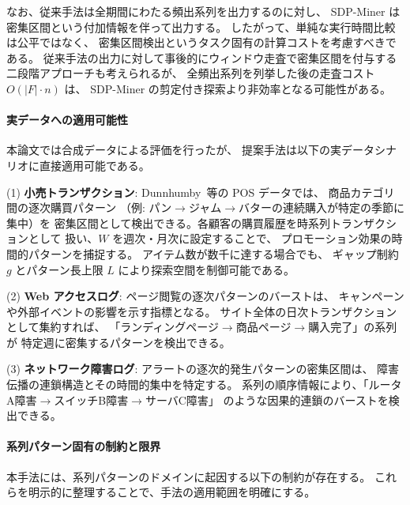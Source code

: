 \documentclass[11pt,a4paper]{article}
\begin{document}
なお、従来手法は全期間にわたる頻出系列を出力するのに対し、
SDP-Miner は密集区間という付加情報を伴って出力する。
したがって、単純な実行時間比較は公平ではなく、
密集区間検出というタスク固有の計算コストを考慮すべきである。
従来手法の出力に対して事後的にウィンドウ走査で密集区間を付与する
二段階アプローチも考えられるが、
全頻出系列を列挙した後の走査コスト $O(|F| \cdot n)$ は、
SDP-Miner の剪定付き探索より非効率となる可能性がある。

\paragraph{実データへの適用可能性}
本論文では合成データによる評価を行ったが、
提案手法は以下の実データシナリオに直接適用可能である。

\noindent
(1) \textbf{小売トランザクション}:
Dunnhumby~\cite{Dunnhumby2014}等の POS データでは、
商品カテゴリ間の逐次購買パターン
（例: パン$\to$ジャム$\to$バターの連続購入が特定の季節に集中）を
密集区間として検出できる。各顧客の購買履歴を時系列トランザクションとして
扱い、$W$ を週次・月次に設定することで、
プロモーション効果の時間的パターンを捕捉する。
アイテム数が数千に達する場合でも、
ギャップ制約 $g$ とパターン長上限 $L$ により探索空間を制御可能である。

\noindent
(2) \textbf{Web アクセスログ}:
ページ閲覧の逐次パターンのバーストは、
キャンペーンや外部イベントの影響を示す指標となる。
サイト全体の日次トランザクションとして集約すれば、
「ランディングページ$\to$商品ページ$\to$購入完了」の系列が
特定週に密集するパターンを検出できる。

\noindent
(3) \textbf{ネットワーク障害ログ}:
アラートの逐次的発生パターンの密集区間は、
障害伝播の連鎖構造とその時間的集中を特定する。
系列の順序情報により、「ルータA障害$\to$スイッチB障害$\to$サーバC障害」
のような因果的連鎖のバーストを検出できる。

\paragraph{系列パターン固有の制約と限界}

本手法には、系列パターンのドメインに起因する以下の制約が存在する。
これらを明示的に整理することで、手法の適用範囲を明確にする。
\end{document}
